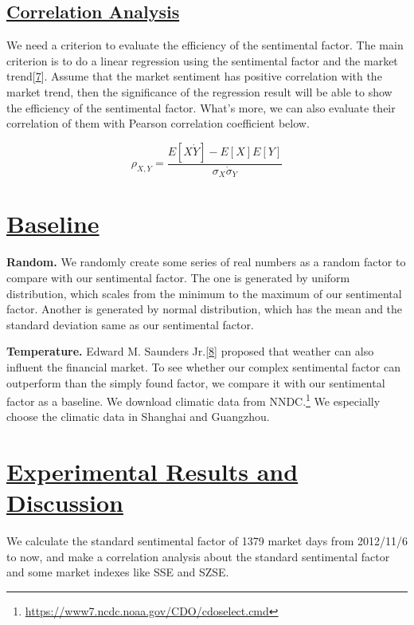 \documentclass[10pt, conference, compsocconf]{IEEEtran}
\begin{document}
\subsection{\underline{Correlation Analysis}}
We need a criterion to evaluate the efficiency of the sentimental factor. The main criterion is to do a linear regression using the sentimental factor and the market trend[\hyperref[ref 7]{7}]. Assume that the market sentiment has positive correlation with the market trend, then the significance of the regression result will be able to show the efficiency of the sentimental factor. What's more, we can also evaluate their correlation of them with Pearson correlation coefficient below.

\begin{equation}
\rho_{X,Y} = \frac{E[X\dot Y]-E[X]E[Y]}{\sigma_{X}\dot \sigma_{Y}}
\end{equation}

\vspace{0.5cm}

\section{\underline{Baseline}}

\textbf{Random.} We randomly create some series of real numbers as a random factor to compare with our sentimental factor. The one is generated by uniform distribution, which scales from the minimum to the maximum of our sentimental factor. Another is generated by normal distribution, which has the mean and the standard deviation same as our sentimental factor.

\textbf{Temperature.} Edward M. Saunders Jr.[\hyperref[ref 8]{8}] proposed that weather can also influent the financial market. To see whether our complex sentimental factor can outperform than the simply found factor, we compare it with our sentimental factor as a baseline. We download climatic data from NNDC.\footnote{\href{https://www7.ncdc.noaa.gov/CDO/cdoselect.cmd}{https://www7.ncdc.noaa.gov/CDO/cdoselect.cmd}} We especially choose the climatic data in Shanghai and Guangzhou.

\section{\underline{Experimental Results and Discussion}}

We calculate the standard sentimental factor of 1379 market days from 2012/11/6 to now, and make a correlation analysis about the standard sentimental factor and some market indexes like SSE and SZSE.
\end{document}
